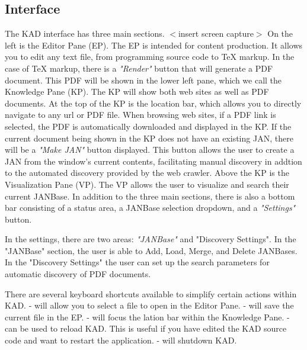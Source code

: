 \documentclass{article}
\begin{document}
\begin{doublespace}
\section{Interface}
The KAD interface has three main sections.
$<$insert screen capture$>$
On the left is the Editor Pane (EP).
The EP is intended for content production.
It allows you to edit any text file, from programming source code to TeX markup.
In the case of TeX markup, there is a {\it "Render"} button that will generate a PDF document.
This PDF will be shown in the lower left pane, which we call the Knowledge Pane (KP).
The KP will show both web sites as well as PDF documents.
At the top of the KP is the location bar, which allows you to directly navigate to any url or PDF file.
When browsing web sites, if a PDF link is selected, the PDF is automatically downloaded and displayed
in the KP.
If the current document being shown in the KP does not have an existing JAN, there will be a
{\it "Make JAN"} button displayed.
This button allows the user to create a JAN from the window's current contents,
facilitating manual discovery in addtion to the automated discovery provided by the web crawler.
Above the KP is the Visualization Pane (VP).
The VP allows the user to visualize and search their current JANBase.
In addition to the three main sections, there is also a bottom bar consisting of a status area,
a JANBase selection dropdown, and a {\it "Settings"} button.
\par
In the settings, there are two areas: {\it "JANBase"} and {\lt "Discovery Settings"}.
In the "JANBase" section, the user is able to Add, Load, Merge, and Delete JANBases.
In the "Discovery Settings" the user can set up the search parameters for automatic discovery of PDF documents.
\par
There are several keyboard shortcuts available to simplify certain actions within KAD.
 -  will allow you to select a file to open in the Editor Pane.
 -  will save the current file in the EP.
 -  will focus the lation bar within the Knowledge Pane.
 -  can be used to reload KAD.
This is useful if you have edited the KAD source code and want to restart the application.
 -  will shutdown KAD.

\end{doublespace}
\end{document}
